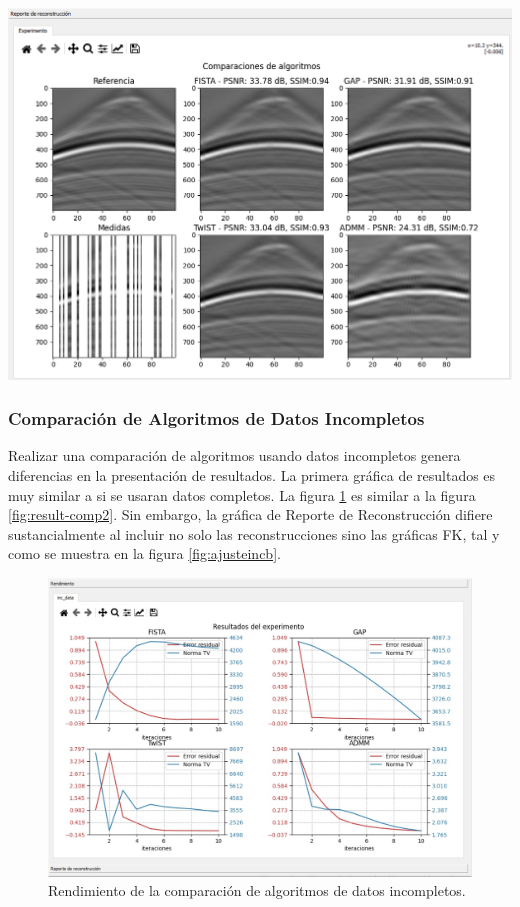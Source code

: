 \documentclass[12pt,twoside,letter]{ol-softwaremanual}
\newenvironment{Figure}
  {\par\medskip\noindent\minipage{\linewidth}}
  {\endminipage\par\medskip}
\begin{document}
\begin{Figure}
	\centering
	\includegraphics[width=0.9\linewidth]{result-comp2.png}
	\label{fig:result-comp2}
\end{Figure}

\newpage

\subsubsection{Comparación de Algoritmos de Datos Incompletos}

Realizar una comparación de algoritmos usando datos incompletos genera diferencias en la presentación de resultados. La primera gráfica de resultados es muy similar a si se usaran datos completos. La figura \ref{fig:ajusteinca} es similar a la figura \ref{fig:result-comp2}. Sin embargo, la gráfica de Reporte de Reconstrucción difiere sustancialmente al incluir no solo las reconstrucciones sino las gráficas FK, tal y como se muestra en la figura \ref{fig:ajusteincb}.

\begin{figure}[h]
	\centering
	\includegraphics[width=0.7\linewidth]{figures/ajusteinca}
	\caption{Rendimiento de la comparación de algoritmos de datos incompletos.}
	\label{fig:ajusteinca}
\end{figure}
\end{document}
